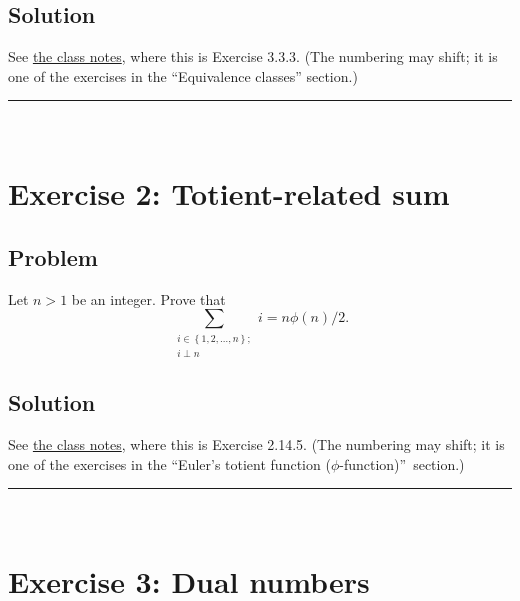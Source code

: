 \documentclass[paper=a4, fontsize=12pt]{scrartcl}%
\let\sumnonlimits\sum
\renewcommand{\sum}{\sumnonlimits\limits}
\theoremstyle{plainsl}
\theoremstyle{definition}
\theoremstyle{remark}
\begin{document}
\subsection{Solution}

See \href{http://www.cip.ifi.lmu.de/~grinberg/t/19s/notes.pdf}{the class
notes}, where this is Exercise 3.3.3. (The numbering may shift; it is one of
the exercises in the ``Equivalence classes'' section.)

\rule{\linewidth}{0.3pt} \\[0.4cm]

\section{Exercise 2: Totient-related sum}

\subsection{Problem}

Let $n > 1$ be an integer. Prove that
\[
\sum_{\substack{i \in\left\{  1, 2, \ldots, n \right\}  ; \\i \perp n}} i = n
\phi\left(  n \right)  / 2 .
\]


\subsection{Solution}

See \href{http://www.cip.ifi.lmu.de/~grinberg/t/19s/notes.pdf}{the class
notes}, where this is Exercise 2.14.5. (The numbering may shift; it is one of
the exercises in the \textquotedblleft Euler's totient function ($\phi
$-function)\textquotedblright\ section.)



\rule{\linewidth}{0.3pt} \\[0.4cm]

\section{Exercise 3: Dual numbers}
\end{document}
